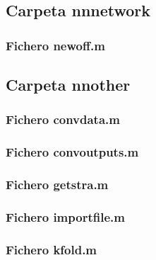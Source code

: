 		\subsection{Carpeta nnnetwork}
		
			\subsubsection{Fichero newoff.m}
			
			
			
		\subsection{Carpeta nnother}
		
			\subsubsection{Fichero convdata.m}
			
			
			
			\subsubsection{Fichero convoutputs.m}
			
			
			
			\subsubsection{Fichero getstra.m}
			
			
			
			\subsubsection{Fichero importfile.m}
			
			
			
			\subsubsection{Fichero kfold.m}
			
			
			

